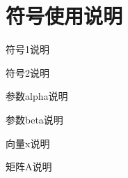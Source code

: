 \chapter*{符号使用说明}

\begin{denotation}

\item[符号1] 符号1说明
\item[符号2] 符号2说明
\item[$\alpha$] 参数alpha说明
\item[$\beta$] 参数beta说明
\item[$\mathbf{x}$] 向量x说明
\item[$\mathbf{A}$] 矩阵A说明

\end{denotation}
